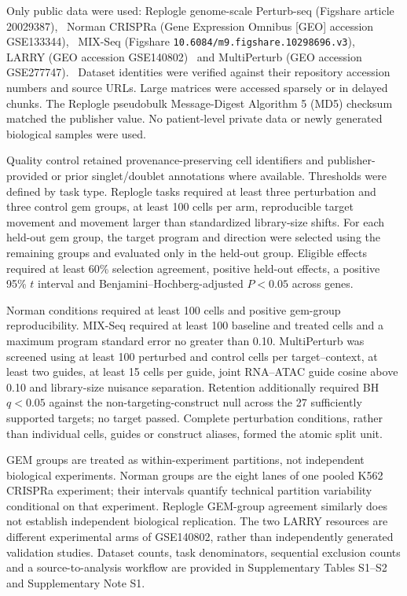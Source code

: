 \documentclass[a4paper,fleqn]{cas-sc}
\makeatletter
\DeclareRobustCommand{\rev}[1]{{\color{red}\def\@citecolor{black}\def\@linkcolor{red}\def\@urlcolor{red}#1}}
\let\unmarkedcite\cite
\renewcommand{\cite}[1]{{\color{black}\def\@citecolor{black}\unmarkedcite{#1}}}
\makeatother
\begin{document}
Only public data were used: Replogle genome-scale Perturb-seq (Figshare article 20029387),~\cite{replogle2022} Norman CRISPRa (Gene Expression Omnibus [GEO] accession GSE133344),~\cite{norman2019} MIX-Seq (Figshare \nolinkurl{10.6084/m9.figshare.10298696.v3}),~\cite{mcfarland2020} LARRY (GEO accession GSE140802)~\cite{weinreb2020} and MultiPerturb (GEO accession GSE277747).~\cite{yan2025} Dataset identities were verified against their repository accession numbers and source URLs. Large matrices were accessed sparsely or in delayed chunks. The Replogle pseudobulk Message-Digest Algorithm 5 (MD5) checksum matched the publisher value. No patient-level private data or newly generated biological samples were used.

Quality control retained provenance-preserving cell identifiers and publisher-provided or prior singlet/doublet annotations where available. Thresholds were defined by task type. Replogle tasks required at least three perturbation and three control gem groups, at least 100 cells per arm, reproducible target movement and movement larger than standardized library-size shifts. For each held-out gem group, the target program and direction were selected using the remaining groups and evaluated only in the held-out group. Eligible effects required at least 60\% selection agreement, positive held-out effects, a positive 95\% $t$ interval and Benjamini--Hochberg-adjusted $P<0.05$ across genes.

Norman conditions required at least 100 cells and positive gem-group reproducibility. MIX-Seq required at least 100 baseline and treated cells and a maximum program standard error no greater than 0.10. \rev{MultiPerturb was screened using at least 100 perturbed and control cells per target--context, at least two guides, at least 15 cells per guide, joint RNA--ATAC guide cosine above 0.10 and library-size nuisance separation.} \rev{Retention additionally required BH $q<0.05$ against the non-targeting-construct null across the 27 sufficiently supported targets; no target passed.} Complete perturbation conditions, rather than individual cells, guides or construct aliases, formed the atomic split unit.

GEM groups are treated as within-experiment partitions, not independent biological experiments. Norman groups are the eight lanes of one pooled K562 CRISPRa experiment; their intervals quantify technical partition variability conditional on that experiment. Replogle GEM-group agreement similarly does not establish independent biological replication. The two LARRY resources are different experimental arms of GSE140802, rather than independently generated validation studies. Dataset counts, task denominators, sequential exclusion counts and a source-to-analysis workflow are provided in Supplementary Tables S1--S2 and Supplementary Note S1.
\end{document}
